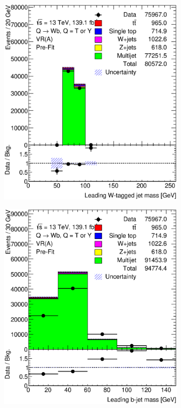 \begin{figure}[hbt!]
\begin{subfigure}{.35\textwidth}
		\includegraphics[width=\linewidth,height=\textheight,keepaspectratio]{VR_B_ljet_m.eps}
		\caption{}
		\label{fig:abcd:furtherimprovement:scaledcorr:ljet_m}
	\end{subfigure}
	\begin{subfigure}{.35\textwidth}
		\centering
		\includegraphics[width=\linewidth,height=\textheight,keepaspectratio]{VR_B_jet_m.eps}

\end{subfigure}
\end{figure}
